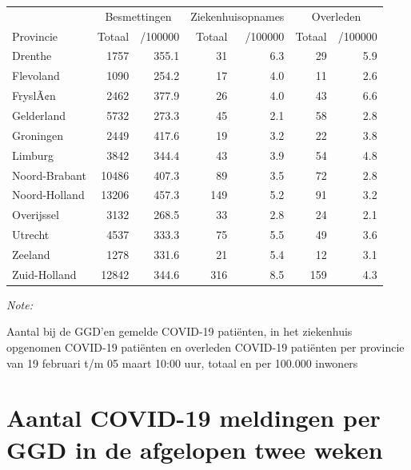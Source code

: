 \documentclass[
  english,
  man,floatsintext]{apa6}
\begin{document}
\begin{table}
\centering
\begin{threeparttable}
\begin{tabular}{lrrrrrr}
\toprule
\multicolumn{1}{c}{ } & \multicolumn{2}{c}{Besmettingen} & \multicolumn{2}{c}{Ziekenhuisopnames} & \multicolumn{2}{c}{Overleden} \\
\cmidrule(l{3pt}r{3pt}){2-3} \cmidrule(l{3pt}r{3pt}){4-5} \cmidrule(l{3pt}r{3pt}){6-7}
Provincie & Totaal & /100000 & Totaal & /100000 & Totaal & /100000\\
\midrule
Drenthe & 1757 & 355.1 & 31 & 6.3 & 29 & 5.9\\
Flevoland & 1090 & 254.2 & 17 & 4.0 & 11 & 2.6\\
FryslÃ¢n & 2462 & 377.9 & 26 & 4.0 & 43 & 6.6\\
Gelderland & 5732 & 273.3 & 45 & 2.1 & 58 & 2.8\\
Groningen & 2449 & 417.6 & 19 & 3.2 & 22 & 3.8\\
Limburg & 3842 & 344.4 & 43 & 3.9 & 54 & 4.8\\
Noord-Brabant & 10486 & 407.3 & 89 & 3.5 & 72 & 2.8\\
Noord-Holland & 13206 & 457.3 & 149 & 5.2 & 91 & 3.2\\
Overijssel & 3132 & 268.5 & 33 & 2.8 & 24 & 2.1\\
Utrecht & 4537 & 333.3 & 75 & 5.5 & 49 & 3.6\\
Zeeland & 1278 & 331.6 & 21 & 5.4 & 12 & 3.1\\
Zuid-Holland & 12842 & 344.6 & 316 & 8.5 & 159 & 4.3\\
\bottomrule
\end{tabular}
\begin{tablenotes}
\item \textit{Note: } 
\item Aantal bij de GGD’en gemelde COVID-19 patiënten, in het ziekenhuis opgenomen COVID-19 patiënten en overleden COVID-19 patiënten per provincie van 19 februari t/m 05 maart 10:00 uur, totaal en per 100.000 inwoners
\end{tablenotes}
\end{threeparttable}
\end{table}

\newpage

\hypertarget{aantal-covid-19-meldingen-per-ggd-in-de-afgelopen-twee-weken}{%
\section{Aantal COVID-19 meldingen per GGD in de afgelopen twee weken}\label{aantal-covid-19-meldingen-per-ggd-in-de-afgelopen-twee-weken}}
\end{document}
